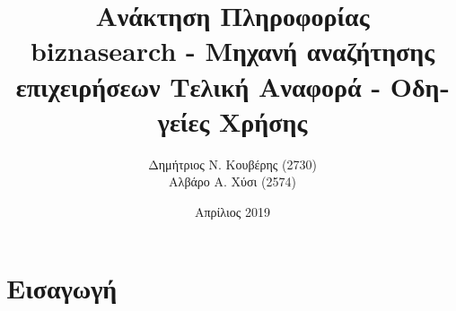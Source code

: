 \documentclass[10pt,a4paper]{article}
\title{%
  \huge \textgreek{Ανάκτηση Πληροφορίας} \\
\large biznasearch - \textgreek{Μηχανή αναζήτησης επιχειρήσεων}}
\author{
    \textgreek{Δημήτριος Ν. Κουβέρης} (2730) \\
    \textgreek{Αλβάρο Α. Χύσι} (2574)
}
\date{\textgreek{Απρίλιος} 2019}
\begin{document}

    \title{
    \huge \textgreek {Τελική Αναφορά - Οδηγείες Χρήσης}}

    \maketitle
    \newpage
    \renewcommand{\contentsname}{\textgreek{Περιεχόμενα}}
    \tableofcontents


    \newpage
    \section{\textgreek{Εισαγωγή}}
    
\end{document}
